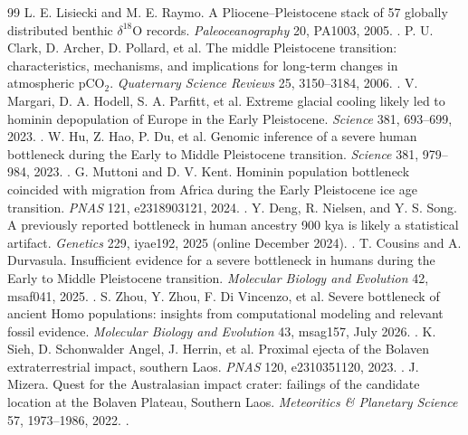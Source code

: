 \begin{thebibliography}{99}
 L. E. Lisiecki and M. E. Raymo. A Pliocene--Pleistocene stack of 57 globally distributed benthic $\delta^{18}$O records. \emph{Paleoceanography} 20, PA1003, 2005. .
 P. U. Clark, D. Archer, D. Pollard, et al. The middle Pleistocene transition: characteristics, mechanisms, and implications for long-term changes in atmospheric pCO$_2$. \emph{Quaternary Science Reviews} 25, 3150--3184, 2006. .
 V. Margari, D. A. Hodell, S. A. Parfitt, et al. Extreme glacial cooling likely led to hominin depopulation of Europe in the Early Pleistocene. \emph{Science} 381, 693--699, 2023. .
 W. Hu, Z. Hao, P. Du, et al. Genomic inference of a severe human bottleneck during the Early to Middle Pleistocene transition. \emph{Science} 381, 979--984, 2023. .
 G. Muttoni and D. V. Kent. Hominin population bottleneck coincided with migration from Africa during the Early Pleistocene ice age transition. \emph{PNAS} 121, e2318903121, 2024. .
 Y. Deng, R. Nielsen, and Y. S. Song. A previously reported bottleneck in human ancestry 900 kya is likely a statistical artifact. \emph{Genetics} 229, iyae192, 2025 (online December 2024). .
 T. Cousins and A. Durvasula. Insufficient evidence for a severe bottleneck in humans during the Early to Middle Pleistocene transition. \emph{Molecular Biology and Evolution} 42, msaf041, 2025. .
 S. Zhou, Y. Zhou, F. Di Vincenzo, et al. Severe bottleneck of ancient Homo populations: insights from computational modeling and relevant fossil evidence. \emph{Molecular Biology and Evolution} 43, msag157, July 2026. .
 K. Sieh, D. Schonwalder Angel, J. Herrin, et al. Proximal ejecta of the Bolaven extraterrestrial impact, southern Laos. \emph{PNAS} 120, e2310351120, 2023. .
 J. Mizera. Quest for the Australasian impact crater: failings of the candidate location at the Bolaven Plateau, Southern Laos. \emph{Meteoritics \& Planetary Science} 57, 1973--1986, 2022. .
\end{thebibliography}
